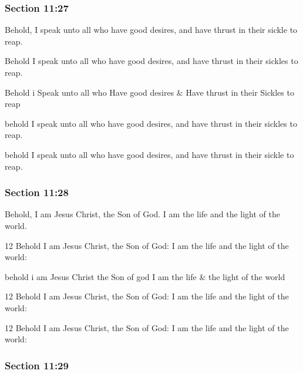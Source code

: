	\subsubsection{Section 11:27} %
		\label{DC11-27}

		Behold, I speak unto all who have good desires, and have thrust in their sickle to reap.

		\begin{framed}
		\scriptsize
			\begin{compactdesc}
				\item[JSP] Behold I speak unto all who have good desires, and have thrust in their sickles to reap.
				\item[HS] Behold i Speak unto all who Have good desires \& Have thrust in their Sickles to reap 
				\item[DC 1835] behold I speak unto all who have good desires, and have thrust in their sickles to reap.
				\item[DC 1844] behold I speak unto all who have good desires, and have thrust in their sickle to reap.
			\end{compactdesc}
		\end{framed}

	\subsubsection{Section 11:28} %
		\label{DC11-28}

		Behold, I am Jesus Christ, the Son of God.  I am the life and the light of the world.

		\begin{framed}
		\scriptsize
			\begin{compactdesc}
				\item[JSP] 12 Behold I am Jesus Christ, the Son of God: I am the life and the light of the world:
				\item[HS] behold i am Jesus Christ the Son of god I am the life \& the light of the world 
				\item[DC 1835] 12 Behold I am Jesus Christ, the Son of God: I am the life and the light of the world: 
				\item[DC 1844] 12 Behold I am Jesus Christ, the Son of God: I am the life and the light of the world: 
			\end{compactdesc}
		\end{framed}

	\subsubsection{Section 11:29} %
		\label{DC11-29}

